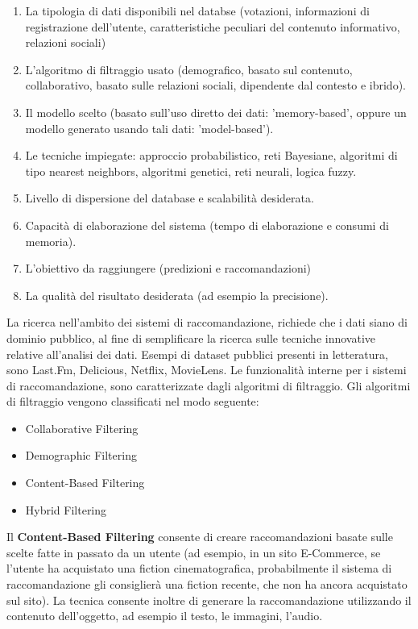 \documentclass[11pt]{article}
\begin{document}
\begin{enumerate}
\item La tipologia di dati disponibili nel databse (votazioni, informazioni di registrazione dell'utente, caratteristiche peculiari del contenuto informativo, relazioni sociali)
\item L'algoritmo di filtraggio usato (demografico, basato sul contenuto, collaborativo, basato sulle relazioni sociali, dipendente dal contesto e ibrido).
\item Il modello scelto (basato sull'uso diretto dei dati: 'memory-based', oppure un modello generato usando tali dati: 'model-based').
\item Le tecniche impiegate: approccio probabilistico, reti Bayesiane, algoritmi di tipo nearest neighbors, algoritmi genetici, reti neurali, logica fuzzy.
\item Livello di dispersione del database e scalabilità desiderata.
\item Capacità di elaborazione del sistema (tempo di elaborazione e consumi di memoria).
\item L'obiettivo da raggiungere (predizioni e raccomandazioni)
\item La qualità del risultato desiderata (ad esempio la precisione).
\end{enumerate}

La ricerca nell'ambito dei sistemi di raccomandazione, richiede che i dati siano di dominio pubblico, al fine di semplificare la ricerca sulle tecniche innovative relative all'analisi dei dati. Esempi di dataset pubblici presenti in letteratura, sono Last.Fm, Delicious, Netflix, MovieLens.
Le funzionalità interne per i sistemi di raccomandazione, sono caratterizzate dagli algoritmi di filtraggio. 
Gli algoritmi di filtraggio vengono classificati nel modo seguente:
\begin{itemize}
	\item Collaborative Filtering
	\item Demographic Filtering
	\item Content-Based Filtering
	\item Hybrid Filtering
\end{itemize}

Il \textbf{Content-Based Filtering} consente di creare raccomandazioni basate sulle scelte fatte in passato da un utente (ad esempio, in un sito E-Commerce, se l'utente ha acquistato una fiction cinematografica, probabilmente il sistema di raccomandazione gli consiglierà una fiction recente, che non ha ancora acquistato sul sito). La tecnica consente inoltre di generare la raccomandazione utilizzando il contenuto dell'oggetto, ad esempio il testo, le immagini, l'audio.
\end{document}

